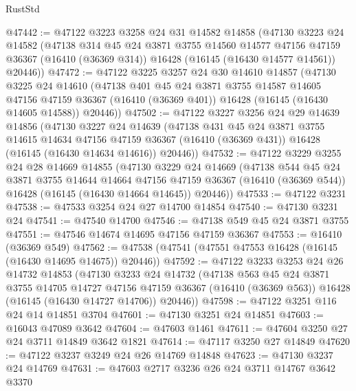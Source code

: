 \begin{lexlean}{RustStd}
\begin{coremodule}
@47442 := @47122
    @3223
    @3258
    @24
    @31
    @14582
    @14858
    (@47130
      @3223
      @24
      @14582
      (@47138
        @314
        @45
        @24
        @3871
        @3755
        @14560
        @14577
        @47156
        @47159
        @36367
        (@16410 (@36369 @314))
        @16428
        (@16145 (@16430 @14577 @14561))
        @20446))
@47472 := @47122
    @3225
    @3257
    @24
    @30
    @14610
    @14857
    (@47130
      @3225
      @24
      @14610
      (@47138
        @401
        @45
        @24
        @3871
        @3755
        @14587
        @14605
        @47156
        @47159
        @36367
        (@16410 (@36369 @401))
        @16428
        (@16145 (@16430 @14605 @14588))
        @20446))
@47502 := @47122
    @3227
    @3256
    @24
    @29
    @14639
    @14856
    (@47130
      @3227
      @24
      @14639
      (@47138
        @431
        @45
        @24
        @3871
        @3755
        @14615
        @14634
        @47156
        @47159
        @36367
        (@16410 (@36369 @431))
        @16428
        (@16145 (@16430 @14634 @14616))
        @20446))
@47532 := @47122
    @3229
    @3255
    @24
    @28
    @14669
    @14855
    (@47130
      @3229
      @24
      @14669
      (@47138
        @544
        @45
        @24
        @3871
        @3755
        @14644
        @14664
        @47156
        @47159
        @36367
        (@16410 (@36369 @544))
        @16428
        (@16145 (@16430 @14664 @14645))
        @20446))
@47533 := @47122 @3231
@47538 := @47533 @3254 @24 @27 @14700 @14854
@47540 := @47130 @3231 @24
@47541 := @47540 @14700
@47546 := @47138 @549 @45 @24 @3871 @3755
@47551 := @47546 @14674 @14695 @47156 @47159 @36367
@47553 := @16410 (@36369 @549)
@47562 := @47538 (@47541 (@47551 @47553 @16428 (@16145 (@16430 @14695 @14675)) @20446))
@47592 := @47122
    @3233
    @3253
    @24
    @26
    @14732
    @14853
    (@47130
      @3233
      @24
      @14732
      (@47138
        @563
        @45
        @24
        @3871
        @3755
        @14705
        @14727
        @47156
        @47159
        @36367
        (@16410 (@36369 @563))
        @16428
        (@16145 (@16430 @14727 @14706))
        @20446))
@47598 := @47122 @3251 @116 @24 @14 @14851 @3704
@47601 := @47130 @3251 @24 @14851
@47603 := @16043 @47089 @3642
@47604 := @47603 @1461
@47611 := @47604 @3250 @27 @24 @3711 @14849 @3642 @1821
@47614 := @47117 @3250 @27 @14849
@47620 := @47122 @3237 @3249 @24 @26 @14769 @14848
@47623 := @47130 @3237 @24 @14769
@47631 := @47603 @2717 @3236 @26 @24 @3711 @14767 @3642 @3370

\end{coremodule}
\end{lexlean}
